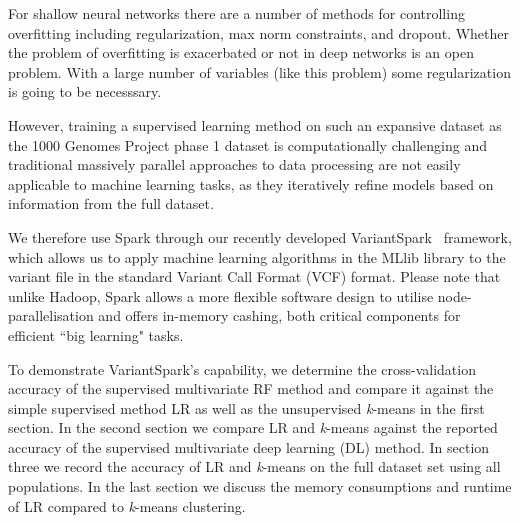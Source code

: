 \documentclass{llncs}
\newcommand{\variantSpark}{{\sc VariantSpark}}
\newcommand{\kMeans}{\textit{k}-means }
\begin{document}
{For shallow neural networks there are a number of methods for controlling overfitting including regularization, max norm
constraints, and dropout. Whether the problem of overfitting is exacerbated or not in deep networks is an open problem.
With a large number of variables (like this problem) some regularization is going to be necesssary. 

However, training a supervised learning method on such an expansive dataset as the 1000 Genomes Project phase 1 dataset is computationally 
challenging and traditional massively parallel approaches to data processing are not easily applicable to machine learning 
tasks, as they iteratively refine models based on information from the full dataset.

We therefore use {\sc Spark} through our recently developed \variantSpark~\cite{OBrien} framework, which allows us to
apply machine learning algorithms in the {\sc MLlib} library to the variant file in the standard Variant Call Format (VCF) format.  Please note
that unlike {\sc Hadoop}, {\sc Spark} allows a more flexible software design to utilise node-parallelisation and offers
in-memory cashing, both critical components for efficient ``big learning" tasks.

To demonstrate \variantSpark's capability, we determine the cross-validation accuracy of the supervised multivariate RF
method and compare it against the simple supervised method LR as well as the unsupervised \kMeans{} in the first
section.  In the second section we compare LR and \kMeans{} against the reported accuracy of the supervised multivariate
deep learning (DL) method.  In section three we record the accuracy of LR and \kMeans{} on the full dataset set using all populations.
In the last section we discuss the memory consumptions and runtime of LR compared to \kMeans{} clustering.


}
\end{document}
